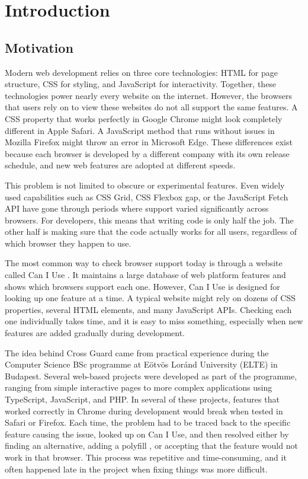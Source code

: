 \chapter{Introduction}
\label{ch:intro}

\section{Motivation}
\label{sec:motivation}

Modern web development relies on three core technologies: HTML for page structure, CSS for styling, and JavaScript for interactivity. Together, these technologies power nearly every website on the internet. However, the browsers that users rely on to view these websites do not all support the same features. A CSS property that works perfectly in Google Chrome might look completely different in Apple Safari. A JavaScript method that runs without issues in Mozilla Firefox might throw an error in Microsoft Edge. These differences exist because each browser is developed by a different company with its own release schedule, and new web features are adopted at different speeds.

This problem is not limited to obscure or experimental features. Even widely used capabilities such as CSS Grid, CSS Flexbox gap, or the JavaScript Fetch API have gone through periods where support varied significantly across browsers. For developers, this means that writing code is only half the job. The other half is making sure that the code actually works for all users, regardless of which browser they happen to use.

The most common way to check browser support today is through a website called Can I Use \cite{caniuse}. It maintains a large database of web platform features and shows which browsers support each one. However, Can I Use is designed for looking up one feature at a time. A typical website might rely on dozens of CSS properties, several HTML elements, and many JavaScript APIs. Checking each one individually takes time, and it is easy to miss something, especially when new features are added gradually during development.

The idea behind Cross Guard came from practical experience during the Computer Science BSc programme at Eötvös Loránd University (ELTE) in Budapest. Several web-based projects were developed as part of the programme, ranging from simple interactive pages to more complex applications using TypeScript, JavaScript, and PHP. In several of these projects, features that worked correctly in Chrome during development would break when tested in Safari or Firefox. Each time, the problem had to be traced back to the specific feature causing the issue, looked up on Can I Use, and then resolved either by finding an alternative, adding a polyfill \cite{sharp2010polyfill}, or accepting that the feature would not work in that browser. This process was repetitive and time-consuming, and it often happened late in the project when fixing things was more difficult.

